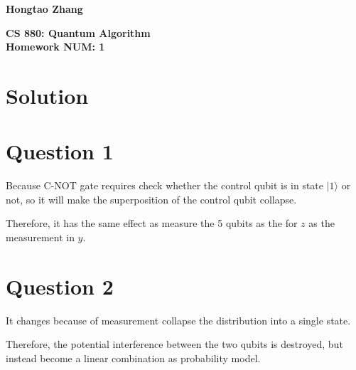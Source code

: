 \documentclass{article}%
\begin{document}
\newcommand{\ket}[1]{|#1\rangle}

\begin{flushright}
    \textbf{Hongtao Zhang \\}
\end{flushright}

\begin{center}
    \textbf{CS 880: Quantum Algorithm \\
        Homework NUM: 1} \\
\end{center}

\section*{Solution}

\section*{Question 1}

Because C-NOT gate requires check whether the control qubit is in state $|1\rangle$ or not,
so it will make the superposition of the control qubit collapse.

Therefore, it has the same effect as measure the 5 qubits as the for $z$ as the measurement in $y$.

\section*{Question 2}

It changes because of measurement collapse the distribution into a single state.

Therefore, the potential interference between the two qubits is destroyed, but instead become a linear combination as probability model.
\end{document}
